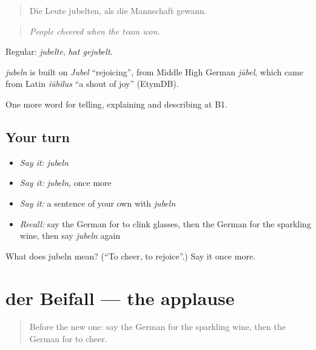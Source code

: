 \begin{quote}
Die Leute jubelten, als die Mannschaft gewann.
\end{quote}

\begin{quote}
\emph{People cheered when the team won.}
\end{quote}

Regular: \emph{jubelte}, \emph{hat gejubelt}.

\begin{cousinweb}
\emph{jubeln} is built on \emph{Jubel} \textquotedblleft{}rejoicing\textquotedblright{}, from Middle High German \emph{jūbel}, which came from Latin \emph{iūbilus} \textquotedblleft{}a shout of joy\textquotedblright{} (EtymDB).
\end{cousinweb}

\begin{grammarlens}[title={What you've built}]
One more word for telling, explaining and describing at B1.
\end{grammarlens}

\subsection*{Your turn}
\begin{itemize}
\raggedright
  \item \emph{Say it:} \emph{jubeln}
  \item \emph{Say it:} \emph{jubeln}, once more
  \item \emph{Say it:} a sentence of your own with \emph{jubeln}
  \item \emph{Recall:} say the German for to clink glasses, then the German for the sparkling wine, then say \emph{jubeln} again
\end{itemize}

\begin{tcolorbox}[breakable,colback=teal!4,colframe=teal!35!black,title={Before you move on}]
What does jubeln mean? (\textquotedblleft{}To cheer, to rejoice\textquotedblright{}.) Say it once more.
\end{tcolorbox}
\section[der Beifall]{der Beifall — the applause}

\label{lesson:GE-C308-beifall}



\begin{quote}
Before the new one: say the German for the sparkling wine, then the German for to cheer.
\end{quote}

